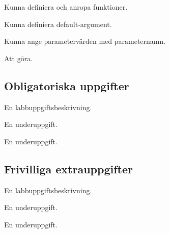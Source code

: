 
\Lab{\LabWeekTHREE}

\begin{Goals}
\item Kunna definiera och anropa funktioner.
\item Kunna definiera default-argument.
\item Kunna ange parametervärden med parameternamn.
\end{Goals}

\begin{Preparations}
\item Att göra.
\end{Preparations}

\subsection{Obligatoriska uppgifter}

\Task En labbuppgiftsbeskrivning.

\Subtask En underuppgift.

\Subtask En underuppgift.

\subsection{Frivilliga extrauppgifter}

\Task En labbuppgiftsbeskrivning.

\Subtask En underuppgift.

\Subtask En underuppgift.
